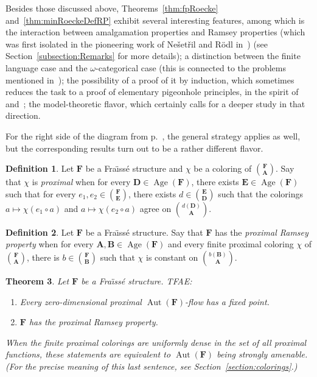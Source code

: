 \documentclass[11pt]{article}
\newtheorem{theo}{Theorem}[section]
\theoremstyle{definition}
\newtheorem{defi}[theo]{Definition}
\numberwithin{equation}{section}
\numberwithin{figure}{section}
\numberwithin{table}{section}
\newcommand*{\mA}{\mathbf{A}}
\newcommand*{\mB}{\mathbf{B}}
\newcommand*{\mD}{\mathbf{D}}
\newcommand*{\mE}{\mathbf{E}}
\newcommand*{\mF}{\mathbf{F}}
\DeclareMathOperator{\Aut}{Aut}
\DeclareMathOperator{\Age}{Age}
\begin{document}
Besides those discussed above, Theorems~\ref{thm:fpRoecke} and~\ref{thm:minRoeckeDefRP} exhibit several interesting features, among which is the interaction between amalgamation properties and Ramsey properties (which was first isolated in the pioneering work of Ne\v set\v ril and R\"odl in~\cite{NR2}) (see Section~\ref{subsection:Remarks} for more details); a distinction between the finite language case and the $\omega$-categorical case (this is connected to the problems mentioned in~\cite[Section~7]{BPT}); the possibility of a proof of it by induction, which sometimes reduces the task to a proof of elementary pigeonhole principles, in the spirit of~\cite{T} and~\cite{Sol4}; the model-theoretic flavor, which certainly calls for a deeper study in that direction.

For the right side of the diagram from p.~\pageref{firstdiagram}, the general strategy applies as well, but the corresponding results turn out to be a rather different flavor.

\begin{defi}\label{def:proxcoloring}
Let $\mF$ be a Fra\"{\i}ss\'e structure and $\chi$ be a coloring of $\binom{\mF}{\mA}$. Say that $\chi$ is \emph{proximal} when for every $\mD \in \Age(\mF)$, there exists $\mE \in \Age(\mF)$ such that for every $e_{1}, e_{2}\in \binom{\mF}{\mE}$, there exists $d\in \binom{\mE}{\mD}$ such that the colorings $a\mapsto \chi(e_{1}\circ a)$ and $a\mapsto \chi(e_{2}\circ a)$ agree on $\binom{d(\mD)}{\mA}$.
\end{defi}

\begin{defi}
Let $\mF$ be a Fra\"{\i}ss\'e structure. Say that $\mF$ has the \emph{proximal Ramsey property} when for every $\mA, \mB \in \Age(\mF)$ and every finite proximal coloring $\chi$ of $\binom{\mF}{\mA}$, there is $b\in \binom{\mF}{\mB}$ such that $\chi$ is constant on $\binom{b(\mB)}{\mA}$.
\end{defi}

\begin{theo}\label{thm:SAProxRP}
Let $\mF$ be a Fra\"{\i}ss\'e structure. TFAE:
\begin{enumerate}
\item Every zero-dimensional proximal $\Aut(\mF)$-flow has a fixed point.
\item $\mF$ has the proximal Ramsey property.
\end{enumerate}
When the finite proximal colorings are uniformly dense in the set of all proximal functions, these statements are equivalent to $\Aut(\mF)$ being strongly amenable. (For the precise meaning of this last sentence, see Section~\ref{section:colorings}.)
\end{theo}
\end{document}
